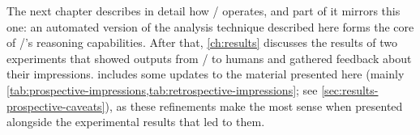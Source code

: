 The next chapter describes in detail how \dunyazad/ operates, and part of it mirrors this one: an automated version of the analysis technique described here forms the core of \dunyazad/'s reasoning capabilities.
%
After that, \cref{ch:results} discusses the results of two experiments that showed outputs from \dunyazad/ to humans and gathered feedback about their impressions.
%
 includes some updates to the material presented here (mainly \cref{tab:prospective-impressions,tab:retrospective-impressions}; see \cref{sec:results-prospective-caveats}), as these refinements make the most sense when presented alongside the experimental results that led to them.
